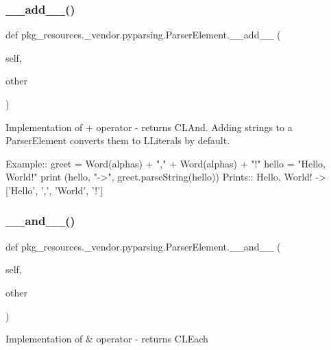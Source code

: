 \subsubsection{\texorpdfstring{\+\_\+\+\_\+add\+\_\+\+\_\+()}{\_\_add\_\_()}}
{\footnotesize\ttfamily def pkg\+\_\+resources.\+\_\+vendor.\+pyparsing.\+Parser\+Element.\+\_\+\+\_\+add\+\_\+\+\_\+ (\begin{DoxyParamCaption}\item[{}]{self,  }\item[{}]{other }\end{DoxyParamCaption})}

\begin{DoxyVerb}Implementation of + operator - returns C{L{And}}. Adding strings to a ParserElement
converts them to L{Literal}s by default.

Example::
    greet = Word(alphas) + "," + Word(alphas) + "!"
    hello = "Hello, World!"
    print (hello, "->", greet.parseString(hello))
Prints::
    Hello, World! -> ['Hello', ',', 'World', '!']
\end{DoxyVerb}
 \mbox{\label{classpkg__resources_1_1__vendor_1_1pyparsing_1_1_parser_element_a3030cb7cad27886b0d8876c3b4e1c4a1}} 
\subsubsection{\texorpdfstring{\+\_\+\+\_\+and\+\_\+\+\_\+()}{\_\_and\_\_()}}
{\footnotesize\ttfamily def pkg\+\_\+resources.\+\_\+vendor.\+pyparsing.\+Parser\+Element.\+\_\+\+\_\+and\+\_\+\+\_\+ (\begin{DoxyParamCaption}\item[{}]{self,  }\item[{}]{other }\end{DoxyParamCaption})}

\begin{DoxyVerb}Implementation of & operator - returns C{L{Each}}
\end{DoxyVerb}
 \mbox{\label{classpkg__resources_1_1__vendor_1_1pyparsing_1_1_parser_element_a43d9a7e720d29a80c49f63998712c9a5}} 
